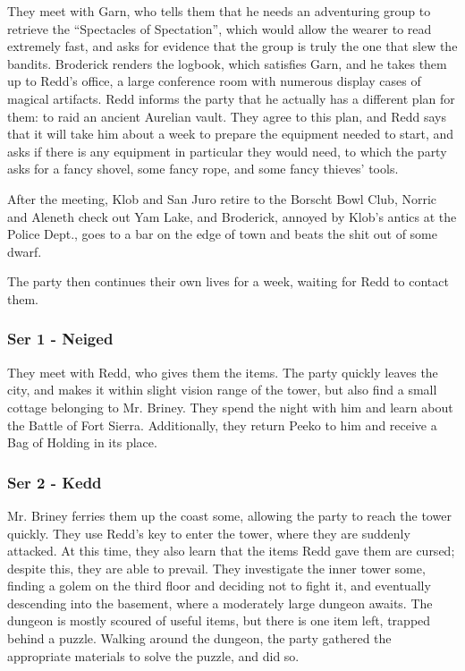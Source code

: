 They meet with Garn, who tells them that he needs an adventuring group to retrieve the ``Spectacles of Spectation'', which would allow the wearer to read extremely fast, and asks for evidence that the group is truly the one that slew the bandits. Broderick renders the logbook, which satisfies Garn, and he takes them up to Redd's office, a large conference room with numerous display cases of magical artifacts. Redd informs the party that he actually has a different plan for them: to raid an ancient Aurelian vault. They agree to this plan, and Redd says that it will take him about a week to prepare the equipment needed to start, and asks if there is any equipment in particular they would need, to which the party asks for a fancy shovel, some fancy rope, and some fancy thieves' tools.

After the meeting, Klob and San Juro retire to the Borscht Bowl Club, Norric and Aleneth check out Yam Lake, and Broderick, annoyed by Klob's antics at the Police Dept., goes to a bar on the edge of town and beats the shit out of some dwarf.

The party then continues their own lives for a week, waiting for Redd to contact them.

\subsubsection{Ser 1 - Neiged}
They meet with Redd, who gives them the items. The party quickly leaves the city, and makes it within slight vision range of the tower, but also find a small cottage belonging to Mr. Briney. They spend the night with him and learn about the Battle of Fort Sierra. Additionally, they return Peeko to him and receive a Bag of Holding in its place.

\subsubsection{Ser 2 - Kedd}
Mr. Briney ferries them up the coast some, allowing the party to reach the tower quickly. They use Redd's key to enter the tower, where they are suddenly attacked. At this time, they also learn that the items Redd gave them are cursed; despite this, they are able to prevail. They investigate the inner tower some, finding a golem on the third floor and deciding not to fight it, and eventually descending into the basement, where a moderately large dungeon awaits. The dungeon is mostly scoured of useful items, but there is one item left, trapped behind a puzzle. Walking around the dungeon, the party gathered the appropriate materials to solve the puzzle, and did so.

